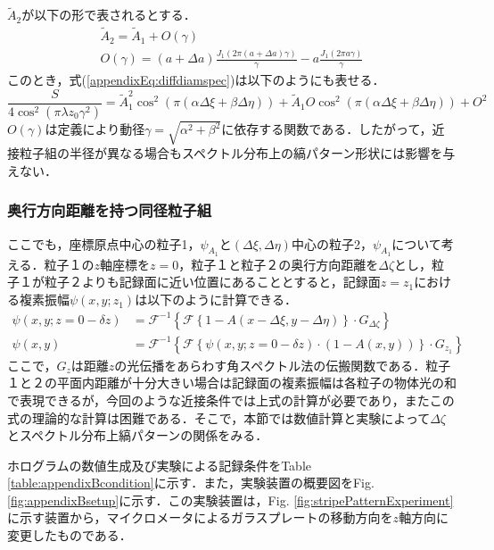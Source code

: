 $\tilde{A}_2$が以下の形で表されるとする．
\begin{gather}
    \tilde{A}_2 = \tilde{A}_1 + O(\gamma) \\
    O(\gamma) = (a+ \Delta a) \frac{J_1(2\pi (a + \Delta a) \gamma)}{\gamma} - a \frac{J_1(2\pi a \gamma)}{\gamma}
\end{gather}
このとき，式(\ref{appendixEq:diffdiamspec})は以下のようにも表せる．
\begin{equation}
    \frac{S}{4\cos^2{\left( \pi \lambda z_0 \gamma^2 \right)}} = \tilde{A}^2_1 \cos^2{\left( \pi \left( \alpha \Delta \xi + \beta \Delta \eta \right) \right)} +  \tilde{A}_1 O \cos^2{\left( \pi \left( \alpha \Delta \xi + \beta \Delta \eta \right) \right)} + O^2
    \label{appendixEq:residual}
\end{equation}
$O(\gamma)$は定義により動径$\gamma = \sqrt{\alpha^2 + \beta^2}$に依存する関数である．したがって，近接粒子組の半径が異なる場合もスペクトル分布上の縞パターン形状には影響を与えない．

\subsubsection{奥行方向距離を持つ同径粒子組}
\label{sec:appendix_deviation_z}

ここでも，座標原点中心の粒子1，$\psi_{A_1}$と$(\Delta \xi, \Delta \eta)$中心の粒子2，$\psi_{A_1}$について考える．粒子１の$z$軸座標を$z = 0$，粒子１と粒子２の奥行方向距離を$\Delta \zeta$とし，粒子１が粒子２よりも記録面に近い位置にあることとすると，記録面$z = z_1$における複素振幅$\psi(x,y;z_1)$は以下のように計算できる．
\begin{align}
    \psi(x,y; z = 0 - \delta z) &=  \mathcal{F}^{-1} \left\{ \mathcal{F}\left\{1 - A(x-\Delta \xi,y- \Delta \eta)\right\} \cdot G_{\Delta \zeta} \right\} \\
    \psi(x,y) &= \mathcal{F}^{-1} \left\{ \mathcal{F}\left\{ \psi(x,y;z = 0-\delta z) \cdot \left( 1 - A(x,y) \right) \right\} \cdot G_{z_1} \right\}
\end{align}
ここで，$G_z$は距離$z$の光伝播をあらわす角スペクトル法の伝搬関数である．粒子１と２の平面内距離が十分大きい場合は記録面の複素振幅は各粒子の物体光の和で表現できるが，今回のような近接条件では上式の計算が必要であり，またこの式の理論的な計算は困難である．そこで，本節では数値計算と実験によって$\Delta \zeta$とスペクトル分布上縞パターンの関係をみる．

ホログラムの数値生成及び実験による記録条件をTable \ref{table:appendixBcondition}に示す．また，実験装置の概要図をFig. \ref{fig:appendixBsetup}に示す．この実験装置は，Fig. \ref{fig:stripePatternExperiment}に示す装置から，マイクロメータによるガラスプレートの移動方向を$z$軸方向に変更したものである．

